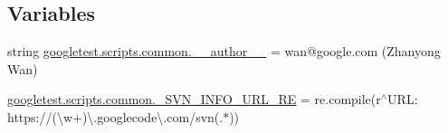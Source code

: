 \subsection*{Variables}
\begin{DoxyCompactItemize}
\item 
string \mbox{\hyperlink{namespacegoogletest_1_1scripts_1_1common_a21a0d2d66bd53eeb56c8a7043f269605}{googletest.\+scripts.\+common.\+\_\+\+\_\+author\+\_\+\+\_\+}} = \textquotesingle{}wan@google.\+com (Zhanyong Wan)\textquotesingle{}
\item 
\mbox{\hyperlink{namespacegoogletest_1_1scripts_1_1common_a2ad8ee62b771b826092d871a84354de3}{googletest.\+scripts.\+common.\+\_\+\+S\+V\+N\+\_\+\+I\+N\+F\+O\+\_\+\+U\+R\+L\+\_\+\+RE}} = re.\+compile(r\textquotesingle{}$^\wedge$U\+R\+L\+: https\+://(\textbackslash{}w+)\textbackslash{}.googlecode\textbackslash{}.\+com/svn(.$\ast$)\textquotesingle{})
\end{DoxyCompactItemize}

